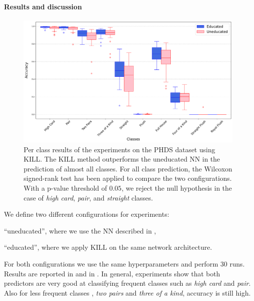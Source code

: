 \paragraph{Results and discussion}\label{par:phds-results}
%

%
\begin{figure}
    \centering
    \includegraphics[width=\linewidth]{figures/phds-kill-results}
    \caption[PHDS KILL results]{
        Per class results of the experiments on the \gls{PHDS} dataset using \gls{KILL}.
        The \gls{KILL} method outperforms the uneducated \gls{NN} in the prediction of almost all classes.
        For all class prediction, the Wilcoxon signed-rank test has been applied to compare the two configurations.
        With a p-value threshold of $0.05$, we reject the null hypothesis in the case of \emph{high card}, \emph{pair}, and \emph{straight} classes.
    }
    \label{fig:phds-kill-results}
\end{figure}
%
We define two different configurations for experiments:
%
\begin{inlinelist}
    \item ``uneducated'', where we use the \gls{NN} described in ,
    \item ``educated'', where we apply \gls{KILL} on the same network architecture.
\end{inlinelist}
%
For both configurations we use the same hyperparameters and perform $30$ runs.
%
Results are reported in  and in .
%
In general, experiments show that both predictors are very good at classifying frequent classes such as \emph{high card} and \emph{pair}.
%
Also for less frequent classes , \emph{two pairs} and \emph{three of a kind}, accuracy is still high.
